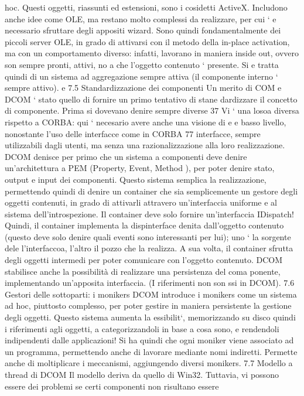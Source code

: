 \documentclass[a4paper,12pt]{article}
\begin{document}
hoc. Questi oggetti, riassunti ed estensioni, sono i cosidetti ActiveX. Includono
anche idee come OLE, ma restano molto complessi da realizzare, per cui `
e
necessario sfruttare degli appositi wizard. Sono quindi fondamentalmente dei
piccoli server OLE, in grado di attivarsi con il metodo della in-place activation,
ma con un comportamento diverso: infatti, lavorano in maniera inside out,
ovvero son sempre pronti, attivi, no a che l'oggetto contenuto ` presente. Si
e
tratta quindi di un sistema ad aggregazione sempre attiva (il componente interno
` sempre attivo).
e
7.5
Standardizzazione dei componenti
Un merito di COM e DCOM ` stato quello di fornire un primo tentativo di stane
dardizzare il concetto di componente. Prima si dovevano denire sempre diverse
37 Vi ` una losoa diversa rispetto a CORBA: qui ` necesario avere anche una visione di
e
e
basso livello, nonostante l'uso delle interfacce come in CORBA
77
\newpage
interfacce, sempre utilizzabili dagli utenti, ma senza una razionalizzazione alla
loro realizzazione.
DCOM denisce per primo che un sistema a componenti deve denire un'architettura a PEM (Property, Event, Method ), per
poter denire stato, output
e input dei componenti. Questo sistema semplica la realizzazione, permettendo quindi di denire un container che sia
semplicemente un gestore degli oggetti
contenuti, in grado di attivarli attravero un'interfaccia uniforme e al sistema dell'introspezione. Il container deve
solo fornire un'interfaccia IDispatch! Quindi,
il container implementa la dispinterface denita dall'oggetto contenuto (questo
deve solo denire quali eventi sono interessanti per lui); uno ` la sorgente dele
l'interfaccoa, l'altro il pozzo che la realizza. A sua volta, il container sfrutta
degli oggetti intermedi per poter comunicare con l'oggetto contenuto.
DCOM stabilisce anche la possibilità di realizzare una persistenza del coma
ponente, implementando un'apposita interfaccia. (I riferimenti non son ssi in
DCOM).
7.6
Gestori delle sottoparti: i monikers
DCOM introduce i monikers come un sistema ad hoc, piuttosto complesso, per
poter gestire in maniera persistente la gestione degli oggetti. Questo sistema
aumenta la essibilit`, memorizzando su disco quindi i riferimenti agli oggetti,
a
categorizzandoli in base a cosa sono, e rendendoli indipendenti dalle applicazioni!
Si ha quindi che ogni moniker viene associato ad un programma, permettendo
anche di lavorare mediante nomi indiretti. Permette anche di moltiplicare i
meccanismi, aggiungendo diversi monikers.
7.7
Modello a thread di DCOM
Il modello deriva da quello di Win32. Tuttavia, vi possono essere dei problemi se certi componenti non risultano essere
\end{document}
